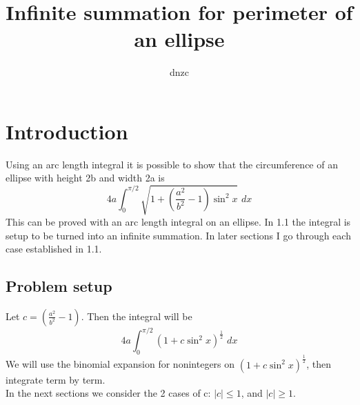\documentclass{article}
\begin{document}
\title{Infinite summation for perimeter of an ellipse}
\author{dnzc}
\date{}

\maketitle

\tableofcontents
\newpage



\section{Introduction}
Using an arc length integral it is possible to show that the circumference of an ellipse with height 2b and width 2a is
\[4a\int_{0}^{\pi/2}\sqrt{1 + (\frac{a^2}{b^2}-1)\sin^2x}\,\,dx\]
This can be proved with an arc length integral on an ellipse. 
In 1.1 the integral is setup to be turned into an infinite summation. 
In later sections I go through each case established in 1.1.
\subsection{Problem setup}
Let $c = (\frac{a^2}{b^2}-1)$. Then the integral will be
\[4a\int_{0}^{\pi/2}(1 + c\sin^2x)^\frac{1}{2}\,\,dx\]
We will use the binomial expansion for nonintegers on $(1 + c\sin^2x)^\frac{1}{2}$, then integrate term by term.\\
In the next sections we consider the 2 cases of c: $|c| \leq 1$, and $|c| \geq 1$.
\end{document}
